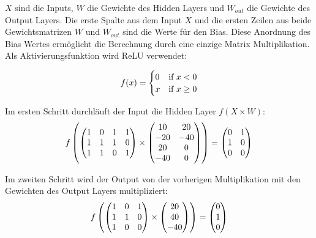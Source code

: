 $ X $ sind die Inputs, $ W $ die Gewichte des Hidden Layers und $ W_{out} $ die Gewichte des Output Layers.
Die erste Spalte aus dem Input $ X $ und die ersten Zeilen aus beide Gewichtsmatrizen $ W $ und $ W_{out} $ sind die Werte für den Bias.
Diese Anordnung des Bias Wertes ermöglicht die Berechnung durch eine einzige Matrix Multiplikation. Als Aktivierungsfunktion wird ReLU 
\cite{10.5555/3104322.3104425} verwendet:

\begin{equation}
  \vspace{5pt}
  f(x) = 
  \begin{cases}
    0 &\text{if \(x < 0\)}  \\
    x &\text{if \(x \geq 0\)} 
  \end{cases}
\end{equation}

Im ersten Schritt durchläuft der Input die Hidden Layer $ f(X \times W) $:
\begin{equation}
  \vspace{5pt}
  f \left(
  \begin{pmatrix}
    1 &0 &1 &1 \\
    1 &1 &1 &0 \\
    1 &1 &0 &1
  \end{pmatrix}
  \times
  \begin{pmatrix}
    10 &20 \\
    -20 &-40 \\
    20 &0 \\
    -40 &0
  \end{pmatrix}
  \right)
  =
  \begin{pmatrix}
    0 &1 \\
    1 &0 \\
    0 &0
  \end{pmatrix}
\end{equation}

Im zweiten Schritt wird der Output von der vorherigen Multiplikation mit den Gewichten des Output Layers multipliziert:
\begin{equation}
  \vspace{5pt}
  f \left(
  \begin{pmatrix}
    1 &0 &1 \\
    1 &1 &0 \\
    1 &0 &0
  \end{pmatrix}
  \times
  \begin{pmatrix}
    20 \\
    40 \\
    -40
  \end{pmatrix}
  \right)
  =
  \begin{pmatrix}
    0 \\
    1 \\
    0
  \end{pmatrix}
\end{equation}

